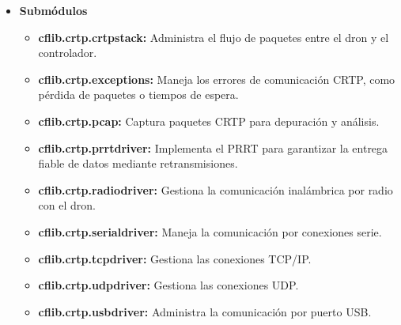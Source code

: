 \begin{itemize}
	\item \textbf{Submódulos}
	\vspace{0.1cm} 
	\begin{itemize}
		\item \textbf{cflib.crtp.crtpstack:} Administra el flujo de paquetes entre el dron y el controlador.
	\end{itemize}
	
	\begin{itemize}
		\item \textbf{cflib.crtp.exceptions:} Maneja los errores de comunicación CRTP, como pérdida de paquetes o tiempos de espera.
	\end{itemize}
	
	\begin{itemize}
		\item \textbf{cflib.crtp.pcap:} Captura paquetes CRTP para depuración y análisis.
	\end{itemize}
	
	\begin{itemize}
		\item \textbf{cflib.crtp.prrtdriver:} Implementa el PRRT para garantizar la entrega fiable de datos mediante retransmisiones.
	\end{itemize}
	
	\begin{itemize}
		\item \textbf{cflib.crtp.radiodriver:} Gestiona la comunicación inalámbrica por radio con el dron.
	\end{itemize}
	
	\begin{itemize}
		\item \textbf{cflib.crtp.serialdriver:} Maneja la comunicación por conexiones serie.
	\end{itemize}
	
	\begin{itemize}
		\item \textbf{cflib.crtp.tcpdriver:} Gestiona las conexiones TCP/IP.
	\end{itemize}
	
	\begin{itemize}
		\item \textbf{cflib.crtp.udpdriver:} Gestiona las conexiones UDP.
	\end{itemize}
	
	\begin{itemize}
		\item \textbf{cflib.crtp.usbdriver:} Administra la comunicación por puerto USB.
	\end{itemize}
\end{itemize}